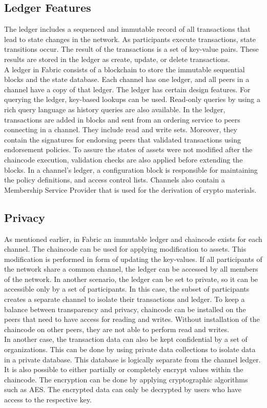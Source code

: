 \documentclass[sigconf,natbib=false]{acmart}
\begin{document}
    \subsection{Ledger Features}
    The ledger includes a sequenced and immutable record of all transactions that lead to state changes in the network. As participants execute transactions, state transitions occur. The result of the transactions is a set of key-value pairs. These results are stored in the ledger as create, update, or delete transactions.\\
    A ledger in Fabric consists of a blockchain to store the immutable sequential blocks and the state database. Each channel has one ledger, and all peers in a channel have a copy of that ledger. The ledger has certain design features. For querying the ledger, key-based lookups can be used. Read-only queries by using a rich query language as history queries are also available. In the ledger, transactions are added in blocks and sent from an ordering service to peers connecting in a channel. They include read and write sets. Moreover, they contain the signatures for endorsing peers that validated transactions using endorsement policies. To assure the states of assets were not modified after the chaincode execution, validation checks are also applied before extending the blocks. In a channel's ledger, a configuration block is responsible for maintaining the policy definitions, and access control lists. Channels also contain a Membership Service Provider that is used for the derivation of crypto materials.\cite{FabricModel}
    \subsection{Privacy}
    As mentioned earlier, in Fabric an immutable ledger and chaincode exists for each channel. The chaincode can be used for applying modification to assets. This modification is performed in form of updating the key-values. If all participants of the network share a common channel, the ledger can be accessed by all members of the network. In another scenario, the ledger can be set to private, so it can be accessible only by a set of participants. In this case, the subset of participants creates a separate channel to isolate their transactions and ledger. To keep a balance between transparency and privacy, chaincode can be installed on the peers that need to have access for reading and writes. Without installation of the chaincode on other peers, they are not able to perform read and writes.\cite{FabricModel}\\
    In another case, the transaction data can also be kept confidential by a set of organizations. This can be done by using private data collections to isolate data in a private database. This database is logically separate from the channel ledger.\\
    It is also possible to either partially or completely encrypt values within the chaincode. The encryption can be done by applying cryptographic algorithms such as AES. The encrypted data can only be decrypted by users who have access to the respective key.\cite{FabricModel}
\end{document}
